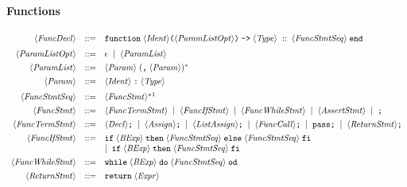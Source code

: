 \documentclass{article}
\begin{document}
\paragraph{Functions}
\[
\begin{array}{rcl}
\langle \mathit{FuncDecl} \rangle
&::=&
\mathtt{function}\;\langle \mathit{Ident} \rangle
\texttt{(}\langle \mathit{ParamListOpt} \rangle\texttt{)}
\;\texttt{->}\;
\langle \mathit{Type} \rangle\;
::\;
\langle \mathit{FuncStmtSeq} \rangle\;
\mathtt{end} \\[6pt]

\langle \mathit{ParamListOpt} \rangle
&::=&
\epsilon
\;\mid\;
\langle \mathit{ParamList} \rangle \\[4pt]

\langle \mathit{ParamList} \rangle
&::=&
\langle \mathit{Param} \rangle\;(\texttt{,}\;\langle \mathit{Param} \rangle)^* \\[4pt]

\langle \mathit{Param} \rangle
&::=&
\langle \mathit{Ident} \rangle\;\texttt{:}\;\langle \mathit{Type} \rangle \\[6pt]

\langle \mathit{FuncStmtSeq} \rangle
&::=&
\langle \mathit{FuncStmt} \rangle^*\footnotemark \\[4pt]

\langle \mathit{FuncStmt} \rangle
&::=&
\langle \mathit{FuncTermStmt} \rangle
\;\mid\;
\langle \mathit{FuncIfStmt} \rangle
\;\mid\;
\langle \mathit{FuncWhileStmt} \rangle
\;\mid\;
\langle \mathit{AssertStmt} \rangle
\;\mid\;
\texttt{;} \\[4pt]

\langle \mathit{FuncTermStmt} \rangle
&::=&
\langle \mathit{Decl} \rangle\texttt{;}
\;\mid\;
\langle \mathit{Assign} \rangle\texttt{;}
\;\mid\;
\langle \mathit{ListAssign} \rangle\texttt{;}
\;\mid\;
\langle \mathit{FuncCall} \rangle\texttt{;}
\;\mid\;
\mathtt{pass}\texttt{;}
\;\mid\;
\langle \mathit{ReturnStmt} \rangle\texttt{;} \\[4pt]

\langle \mathit{FuncIfStmt} \rangle
&::=&
\mathtt{if}\;\langle \mathit{BExp} \rangle\;\mathtt{then}\;\langle \mathit{FuncStmtSeq} \rangle\;\mathtt{else}\;\langle \mathit{FuncStmtSeq} \rangle\;\mathtt{fi} \\
&& \mid\;
\mathtt{if}\;\langle \mathit{BExp} \rangle\;\mathtt{then}\;\langle \mathit{FuncStmtSeq} \rangle\;\mathtt{fi} \\[4pt]

\langle \mathit{FuncWhileStmt} \rangle
&::=&
\mathtt{while}\;\langle \mathit{BExp} \rangle\;\mathtt{do}\;\langle \mathit{FuncStmtSeq} \rangle\;\mathtt{od} \\[4pt]

\langle \mathit{ReturnStmt} \rangle
&::=&
\mathtt{return}\;\langle \mathit{Expr} \rangle
\end{array}
\]
\end{document}
